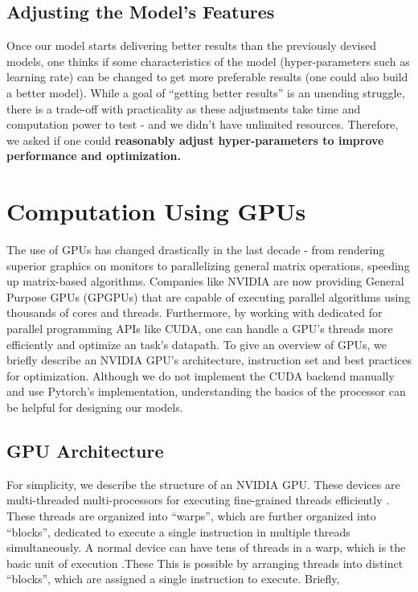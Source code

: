 \subsection{Adjusting the Model's Features} \label{sec:Important Questions - Adjusting the Model's Features}
Once our model starts delivering better results than the previously devised models, one thinks if some characteristics of the model (hyper-parameters such as learning rate) can be changed to get more preferable results (one could also build a better model). While a goal of ``getting better results'' is an unending struggle, there is a trade-off with practicality as these adjustments take time and computation power to test - and we didn't have unlimited resources. Therefore, we asked if one could \textbf{reasonably adjust hyper-parameters to improve performance and optimization.}

\section{Computation Using GPUs} \label{sec:Computation Using GPUs}
The use of GPUs has changed drastically in the last decade - from rendering superior graphics on monitors to parallelizing general matrix operations, speeding up matrix-based algorithms. Companies like NVIDIA are now providing General Purpose GPUs (GPGPUs) that are capable of executing parallel algorithms using thousands of cores and threads. Furthermore, by working with dedicated for parallel programming APIs like CUDA, one can handle a GPU's threads more efficiently and optimize an task's datapath. To give an overview of GPUs, we briefly describe an NVIDIA GPU's architecture, instruction set and best practices for optimization. Although we do not implement the CUDA backend manually and use Pytorch's implementation, understanding the basics of the processor can be helpful for designing our models.

\subsection{GPU Architecture}
For simplicity, we describe the structure of an NVIDIA GPU. These devices are multi-threaded multi-processors for executing fine-grained threads efficiently \cite[Appendix B.4]{PattersonARM}. These threads are organized into ``warps'', which are further organized into ``blocks'', dedicated to execute a single instruction in multiple threads simultaneously. A normal device can have tens of threads in a warp, which is the basic unit of execution \cite{wong2010demystifying}.These This is possible by arranging threads into distinct ``blocks'', which are assigned a single instruction to execute. Briefly, 
